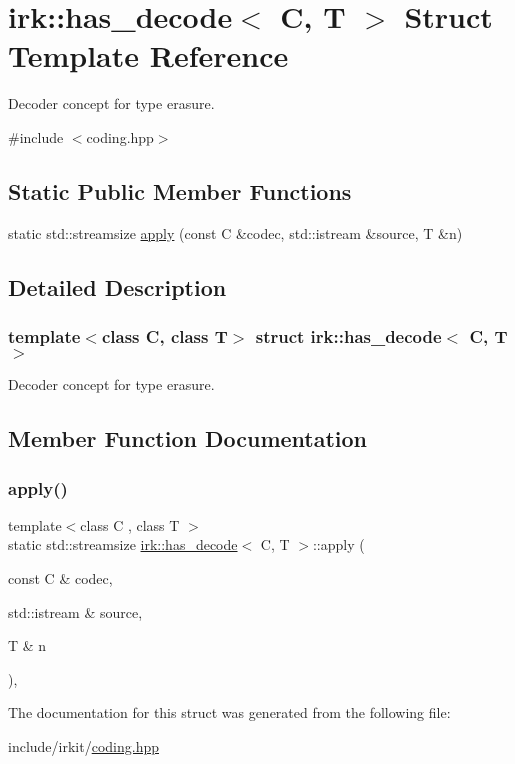 \hypertarget{structirk_1_1has__decode}{}\section{irk\+:\+:has\+\_\+decode$<$ C, T $>$ Struct Template Reference}
\label{structirk_1_1has__decode}


Decoder concept for type erasure.  




{\ttfamily \#include $<$coding.\+hpp$>$}

\subsection*{Static Public Member Functions}
\begin{DoxyCompactItemize}
\item 
static std\+::streamsize \mbox{\hyperlink{structirk_1_1has__decode_ad5b6dc7efe1851816610886d5c70a448}{apply}} (const C \&codec, std\+::istream \&source, T \&n)
\end{DoxyCompactItemize}


\subsection{Detailed Description}
\subsubsection*{template$<$class C, class T$>$\newline
struct irk\+::has\+\_\+decode$<$ C, T $>$}

Decoder concept for type erasure. 

\subsection{Member Function Documentation}
\mbox{\label{structirk_1_1has__decode_ad5b6dc7efe1851816610886d5c70a448}} 
\subsubsection{\texorpdfstring{apply()}{apply()}}
{\footnotesize\ttfamily template$<$class C , class T $>$ \\
static std\+::streamsize \mbox{\hyperlink{structirk_1_1has__decode}{irk\+::has\+\_\+decode}}$<$ C, T $>$\+::apply (\begin{DoxyParamCaption}\item[{const C \&}]{codec,  }\item[{std\+::istream \&}]{source,  }\item[{T \&}]{n }\end{DoxyParamCaption})\hspace{0.3cm}{\ttfamily [inline]}, {\ttfamily [static]}}



The documentation for this struct was generated from the following file\+:\begin{DoxyCompactItemize}
\item 
include/irkit/\mbox{\hyperlink{coding_8hpp}{coding.\+hpp}}\end{DoxyCompactItemize}
